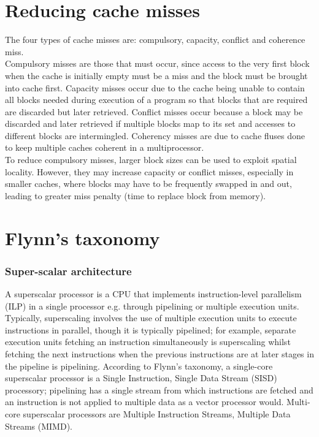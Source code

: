 \documentclass[a4paper, 12pt, oneside]{book}
\begin{document}
\section{Reducing cache misses}

The four types of cache misses are: compulsory, capacity, conflict and coherence miss.\\

Compulsory misses are those that must occur, since access to the very first block when the cache is initially empty must be a miss and the block must be brought into cache first. Capacity misses occur due to the cache being unable to contain all blocks needed during execution of a program so that blocks that are required are discarded but later retrieved. Conflict misses occur because a block may be discarded and later retrieved if multiple blocks map to its set and accesses to different blocks are intermingled. Coherency misses are due to cache fluses done to keep multiple caches coherent in a multiprocessor.\\

To reduce compulsory misses, larger block sizes can be used to exploit spatial locality. However, they may increase capacity or conflict misses, especially in smaller caches, where blocks may have to be frequently swapped in and out, leading to greater miss penalty (time to replace block from memory).

\section{Flynn's taxonomy}

\subsubsection{Super-scalar architecture}
A superscalar processor is a CPU that implements instruction-level parallelism (ILP) in a single processor e.g. through pipelining or multiple execution units. Typically, superscaling involves the use of multiple execution units to execute instructions in parallel, though it is typically pipelined; for example, separate execution units fetching an instruction simultaneously is superscaling whilst fetching the next instructions when the previous instructions are at later stages in the pipeline is pipelining. According to Flynn's taxonomy, a single-core superscalar processor is a Single Instruction, Single Data Stream (SISD) processory; pipelining has a single stream from which instructions are fetched and an instruction is not applied to multiple data as a vector processor would. Multi-core superscalar processors are Multiple Instruction Streams, Multiple Data Streams (MIMD).
\end{document}
